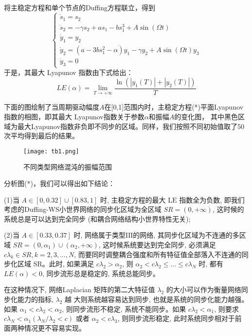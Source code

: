 将主稳定方程和单个节点的Duffing方程联立，得到
\begin{equation}
    \left\{\begin{array}{l}
    \dot{s}_1=s_2 \\
    \dot{s}_2=-\gamma s_2+a s_1-b s_1^3+A \sin (\Omega t) \\
    \dot{y}_1=y_2 \\
    \dot{y}_2=\left(a-3 b s_1^2-\alpha\right) y_1-\gamma y_2+A \sin (\Omega t) y_3 \\
    \dot{y}_3=0
    \end{array}\right.
\end{equation}
于是，其最大 Lyapunov 指数由下式给出：
\begin{equation}
L E(\alpha)=\lim _{T \rightarrow+\infty}
\frac{\ln \left(\left|y_1(T)\right|+\left|y_2(T)\right|\right)}{T}
\end{equation}

下面的图绘制了当周期驱动幅度$A$在[0,1]范围内时，主稳定方程(*)平面Lyapunov指数的相图，即其最大 Lyapunov指数关于参数$\alpha$和振幅$A$的变化图，
其中黑色区域为最大Lyapunov指数非负即不同步的区域。同样，我们按照不同初始值取了50次平均得到最后的结果。\par
\begin{figure}[!htbp]
    \centering
    \texttt{[image: tb1.png]}
    \caption{不同类型网络混沌的振幅范围}
\end{figure}
分析图(*)，我们可以得出如下结论：

(1)当 $A \in[0,0.32] \cup[0.83,1]$ 时, 主稳定方程的最大 $\mathrm{LE}$ 指数全为负数, 即我们考虑的Duffing-WS小世界网络的同步化区域为全区域 $S R=(0,+\infty)$,
这时候的系统总是可以达到完全同步 (和耦合网络结构小世界特性无关);\par

(2)当 $A \in[0.33,0.37]$ 时, 网络属于类型$\mathrm{III}$的网络, 其同步化区域为不连通的多区域 $S R=\left(0, \alpha_1\right) \cup\left(\alpha_2,+\infty\right)$,
这时候系统要达到完全同步, 必须满足 $c \lambda_k \in S R, k=2,3, \ldots, N$,
而要同时调整耦合强度和所有特征值全部落入不连通的同步化区域 SR。此时,
如果满足 $c \lambda_2>\alpha_2$, 则 $\alpha_2<c \lambda_2 \leq \ldots \leq c \lambda_N$ 时,
都有 $L E(\alpha)<0$, 同步流形总是稳定的, 系统总能同步。

在这种情况下, 网络Laplacian 矩阵的第二大特征值
$\lambda_2$ 的大小可以作为衡量网络同步化能力的指标, $\lambda_2$ 越 大则系统越容易达到同步, 也就是系统的同步化能力越强。
如果 $\alpha_1<c \lambda_2<\alpha_2$, 则同步流形不稳定, 系统不能同步。如果 $c \lambda_2<\alpha_1$,
则要求 $c \lambda_N<\alpha_1\left(\lambda_N / \lambda_2<c\right)$ 或者 $\alpha_2<c \lambda_3$, 则同步流形稳定,
此时系统同步相对于前 面两种情况更不容易实现。


